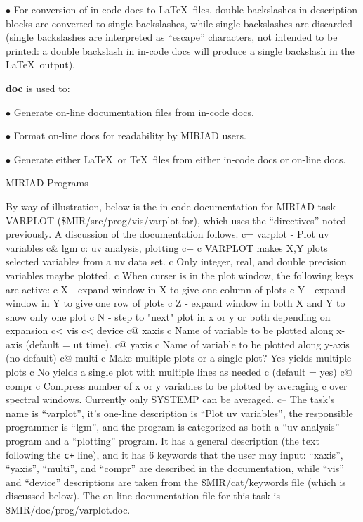 \item{$\bullet$} For conversion of in-code docs to \LaTeX\ files, double
backslashes in description blocks are converted to single backslashes,
while single backslashes are discarded (single backslashes are interpreted
as ``escape'' characters, not intended to be printed:  a double
backslash in in-code docs will produce a single backslash in the \LaTeX\ 
output).

{\bf doc} is used to:
\item{$\bullet$} Generate on-line documentation files from in-code docs.

\item{$\bullet$} Format on-line docs for readability by MIRIAD users.

\item{$\bullet$} Generate either \LaTeX\ or \TeX\ files from either in-code
docs or on-line docs.

\beginsection MIRIAD Programs

By way of illustration, below is the in-code documentation for
MIRIAD task VARPLOT (\$MIR/src/prog/vis/varplot.for), which
uses the ``directives'' noted previously.  A discussion of the
documentation follows.
{\ninepoint\begintt
c= varplot - Plot uv variables
c& lgm
c: uv analysis, plotting
c+
c       VARPLOT makes X,Y plots selected variables from a uv data set.
c       Only integer, real, and double precision variables maybe plotted.
c       When curser is in the plot window, the following keys are active:
c          X - expand window in X to give one column of plots
c          Y - expand window in Y to give one row of plots
c          Z - expand window in both X and Y to show only one plot
c          N - step to "next" plot in x or y or both depending on expansion
c< vis
c< device
c@ xaxis
c       Name of variable to be plotted along x-axis (default = ut time).
c@ yaxis
c       Name of variable to be plotted along y-axis (no default)
c@ multi
c       Make multiple plots or a single plot? Yes yields multiple plots
c       No yields a single plot with multiple lines as needed
c       (default = yes)
c@ compr
c       Compress number of x or y variables to be plotted by averaging
c       over spectral windows. Currently only SYSTEMP can be averaged.
c--
\endtt}
The task's name is ``varplot'', it's one-line description is ``Plot uv
variables'', the responsible programmer is ``lgm'', and the program is
categorized as both a ``uv analysis'' program and a ``plotting'' program.
It has a general description (the text following the {\tt c+} line), and
it has 6 keywords that the user may input:  ``xaxis'', ``yaxis'', ``multi'',
and ``compr'' are described in the documentation, while ``vis'' and
``device'' descriptions are taken from the \$MIR/cat/keywords file (which
is discussed below).  The on-line documentation file for this task is
\$MIR/doc/prog/varplot.doc.

